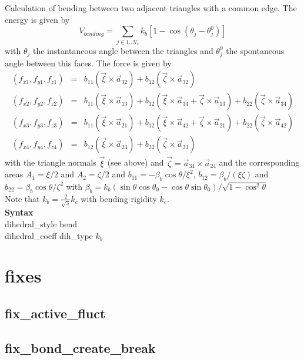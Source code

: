 \documentclass[a4paper,10pt]{scrreprt}
\begin{document}
Calculation of bending between two adjacent triangles with a common edge. The energy is given by
%
\begin{equation}
	V_{bending} = \sum_{j\in1..N_s}k_b[1-\cos(\theta_j-\theta_j^0)]
\end{equation}
%
with $\theta_j$ the instantaneous angle between the triangles and  $\theta_j^0$ the spontaneous angle between this faces. The force is given by
%
\begin{align}
	(f_{x1}, f_{y1}, f_{z1}) &=& b_{11}(\vec{\xi}\times\vec{a}_{32})+b_{12}(\vec{\zeta}\times\vec{a}_{32}) \nonumber \\
(f_{x2}, f_{y2}, f_{z2}) &=& b_{11}(\vec{\xi}\times\vec{a}_{13})+b_{12}(\vec{\xi}\times\vec{a}_{34}+\vec{\zeta}\times\vec{a}_{13})+b_{22}(\vec{\zeta}\times\vec{a}_{34})\nonumber \\
(f_{x3}, f_{y3}, f_{z3}) &=& b_{11}(\vec{\xi}\times\vec{a}_{21})+b_{12}(\vec{\xi}\times\vec{a}_{42}+\vec{\zeta}\times\vec{a}_{21})+b_{22}(\vec{\zeta}\times\vec{a}_{42})\nonumber \\
(f_{x4}, f_{y4}, f_{z4}) &=& b_{12}(\vec{\xi}\times\vec{a}_{23})+b_{22}(\vec{\zeta}\times\vec{a}_{23})
\end{align}
%
with the triangle normals $\vec{\xi}$ (see above) and $\vec{\zeta}=\vec{a}_{34}\times\vec{a}_{24}$ and the corresponding areas $A_1=\xi/2$ and $A_2=\zeta/2$ and $b_{11}=-\beta_b\cos{\theta}/\xi^2$, $b_{12}=\beta_b/(\xi\zeta)$ and $b_{22}=\beta_b\cos{\theta}/\zeta^2$ with $\beta_b=k_b(\sin{\theta}\cos{\theta_0}-\cos{\theta}\sin{\theta_0})/\sqrt{1-\cos^2\theta}$\\

Note that $k_b = \frac{2}{\sqrt{3}} k_c$ with bending rigidity $k_c$.\\

\textbf{Syntax}\\
dihedral\_style \quad bend \\
dihedral\_coeff \quad dih\_type $k_b$

\section{fixes}

\subsection{fix\_active\_fluct}


\subsection{fix\_bond\_create\_break}
\end{document}
